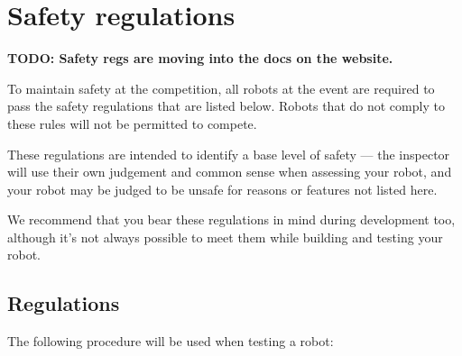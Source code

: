 \section {Safety regulations}
\label{sec:safety-regs}

\textbf{TODO: Safety regs are moving into the docs on the website.}

To maintain safety at the competition, all robots at the event are required to
pass the safety regulations that are listed below. Robots that do not comply
to these rules will not be permitted to compete.

These regulations are intended to identify a base level of safety --- the
inspector will use their own judgement and common sense when assessing
your robot, and your robot may be judged to be unsafe for reasons or features
not listed here.

We recommend that you bear these regulations in mind during development too,
although it's not always possible to meet them while building and testing
your robot.

\subsection{Regulations}

The following procedure will be used when testing a robot:

